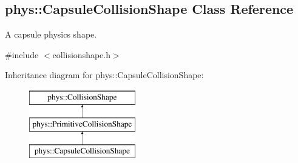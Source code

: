 \hypertarget{classphys_1_1CapsuleCollisionShape}{
\subsection{phys::CapsuleCollisionShape Class Reference}
\label{classphys_1_1CapsuleCollisionShape}
}


A capsule physics shape.  




{\ttfamily \#include $<$collisionshape.h$>$}

Inheritance diagram for phys::CapsuleCollisionShape:\begin{figure}[H]
\begin{center}
\leavevmode
\includegraphics[height=3.000000cm]{classphys_1_1CapsuleCollisionShape}
\end{center}
\end{figure}
